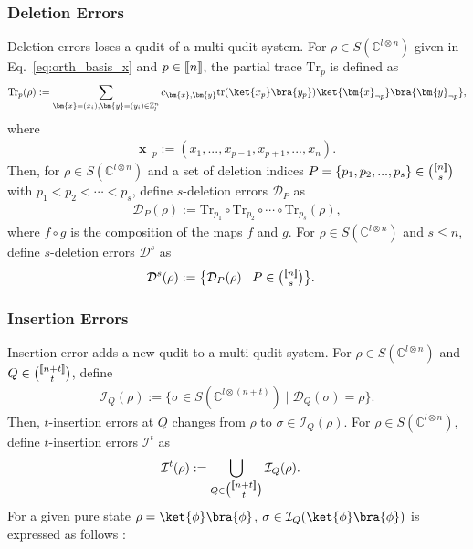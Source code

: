 \documentclass[reprint,amsmath,amssymb,aps,]{revtex4-2}
\theoremstyle{definition}
\newcommand{\SET}[1]{\mathbb{#1}}
\newcommand{\Z}{\SET{Z}}
\newcommand{\C}{\SET{C}}
\newcommand{\1}{\mbox{1}\hspace{-0.25em}\mbox{l}}%
\newcommand{\setint}[1]{[\hspace{-0.5mm}[#1]\hspace{-0.5mm}]}
\newcommand{\subint}[2]{\tbinom{\setint{#1}}{#2}}
\newcommand{\pure}[2]{\C^{#1 \otimes #2}}
\newcommand{\state}[2]{S(\pure{#1}{#2})}
\newcommand{\QU}[1]{\mathcal{#1}}
\begin{document}
\subsubsection{Deletion Errors}
Deletion errors
loses
a qudit of a multi-qudit system.
For $\rho \in \state{l}{n}$ given in Eq.~\eqref{eq:orth_basis_x} and
$p \in \setint{n}$,
the partial trace $\text{Tr}_p$ is defined as 
\begin{align*}
  \text{Tr}_p(\rho)
  :=
  \sum_{ \bm{x}=(x_i), \bm{y}=(y_i) \in \Z_l^n } 
  c_{\bm{x},\bm{y}} 
  \text{tr}( \ket{x_p}\bra{y_p} )
  \ket{ \bm{x}_{ \neg p } }\bra{ \bm{y}_{ \neg p } },
\end{align*}
where
\begin{align*}
  \bm{x}_{ \neg p } := ( x_1, ..., x_{p-1}, x_{p+1}, ..., x_n ).
\end{align*}
Then,
for $\rho \in \state{l}{n}$ and
a set of deletion indices
$P = \{ p_1,p_2,...,p_s \} \in \subint{n}{s}$ with $p_1 < p_2 < \cdots < p_s$,
define $s$-deletion errors $\QU{D}_P$ as 
\begin{align*}
  \QU{D}_P(\rho)
  :=
  \text{Tr}_{p_1} \circ \text{Tr}_{p_2} \circ \cdots \circ \text{Tr}_{p_s}(\rho),
\end{align*}
where $f \circ g$ is the composition of the maps $f$ and $g$.
For $\rho \in \state{l}{n}$ and $s \leq n$,
define $s$-deletion errors $\QU{D}^s$ as
\begin{align*}
  \QU{D}^s(\rho)
  &:=
  \big\{
  \QU{D}_P(\rho)
  \mid
  P \in \subint{n}{s}
  \big\}.
\end{align*}

\subsubsection{Insertion Errors}
Insertion error adds a new qudit to a multi-qudit system.
For $\rho \in \state{l}{n}$ and $Q \in \subint{n+t}{t}$,
define
\begin{align*}
  \QU{I}_Q( \rho ) 
  := 
  \{ 
  \sigma \in \state{l}{(n+t)} 
  \mid 
  \QU{D}_Q(\sigma) = \rho 
  \}.
\end{align*}
Then,
$t$-insertion errors at $Q$
changes from $\rho$ to $\sigma \in \QU{I}_Q(\rho)$.
For $\rho \in \state{l}{n}$,
define $t$-insertion errors $\QU{I}^t$ as
\begin{align*}
  \QU{I}^t(\rho)
  &:=
  \bigcup_{Q \in \subint{n+t}{t}}
  \QU{I}_Q(\rho).
\end{align*}
For a given pure state $\rho = \ket{\phi}\bra{\phi}$,
$\sigma \in \QU{I}_Q(\ket{\phi}\bra{\phi})$
is expressed as follows \cite{sibayama_single_ins_def}:
\end{document}
